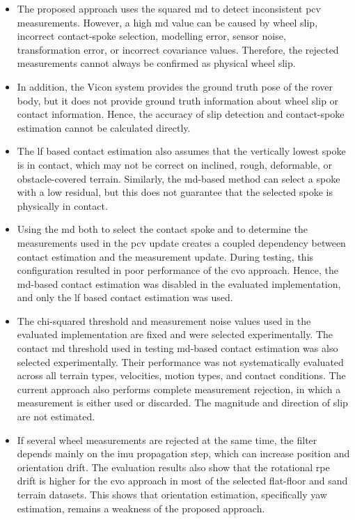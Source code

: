 \documentclass[report.tex]{subfiles}
\begin{document}
    \begin{itemize}
        
    \item The proposed approach uses the squared \gls{md} to detect inconsistent \gls{pcv} measurements. However, a high \gls{md} value can be caused by wheel slip, incorrect contact-spoke selection, modelling error, sensor noise, transformation error, or incorrect covariance values. Therefore, the rejected measurements cannot always be confirmed as physical wheel slip.
    
    \item In addition, the Vicon system provides the ground truth pose of the rover body, but it does not provide ground truth information about wheel slip or contact information. Hence, the accuracy of slip detection and contact-spoke estimation cannot be calculated directly. 
    
    \item The \gls{lf} based contact estimation also assumes that the vertically lowest spoke is in contact, which may not be correct on inclined, rough, deformable, or obstacle-covered terrain. Similarly, the \gls{md}-based method can select a spoke with a low residual, but this does not guarantee that the selected spoke is physically in contact. 

    \item Using the \gls{md} both to select the contact spoke and to determine the measurements used in the \gls{pcv} update creates a coupled dependency between contact estimation and the measurement update. During testing, this configuration resulted in poor performance of the \gls{cvo} approach. Hence, the \gls{md}-based contact estimation was disabled in the evaluated implementation, and only the \gls{lf} based contact estimation was used.
    
    \item The chi-squared threshold and measurement noise values used in the evaluated implementation are fixed and were selected experimentally. The contact \gls{md} threshold used in testing \gls{md}-based contact estimation was also selected experimentally. Their performance was not systematically evaluated across all terrain types, velocities, motion types, and contact conditions. The current approach also performs complete measurement rejection, in which a measurement is either used or discarded. The magnitude and direction of slip are not estimated. 
    
    \item If several wheel measurements are rejected at the same time, the filter depends mainly on the \gls{imu} propagation step, which can increase position and orientation drift. The evaluation results also show that the rotational \gls{rpe} drift is higher for the \gls{cvo} approach in most of the selected flat-floor and sand terrain datasets. This shows that orientation estimation, specifically yaw estimation, remains a weakness of the proposed approach.


\end{itemize}
\end{document}
